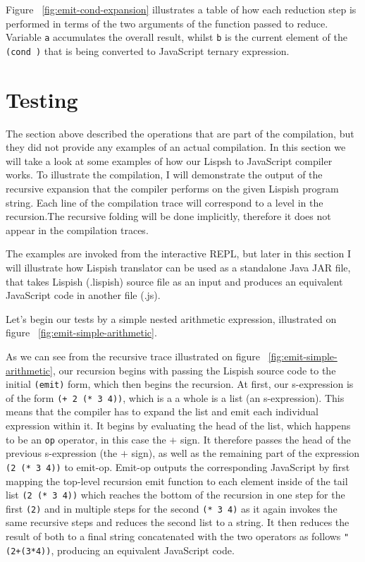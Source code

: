 

Figure ~\ref{fig:emit-cond-expansion} illustrates a table of how each reduction step is performed in terms of the two arguments of the function passed to reduce. Variable \texttt{a} accumulates the overall result, whilst \texttt{b} is the current element of the \texttt{(cond )} that is being converted to JavaScript ternary expression.

\section{Testing}
The section above described the operations that are part of the compilation, but they did not provide any examples of an actual compilation. 
In this section we will take a look at some examples of how our Lispsh to JavaScript compiler works. 
To illustrate the compilation, I will demonstrate the output of the recursive expansion that the compiler performs on the given Lispish program string. 
Each line of the compilation trace will correspond to a level in the recursion.The recursive folding will be done implicitly, therefore it does not appear in the compilation traces. 

The examples are invoked from the interactive REPL, but later in this section I will illustrate how Lispish translator can be used as a standalone Java JAR file, that takes Lispish (.lispish) source file as an input and produces an equivalent JavaScript code in another file (.js).

Let's begin our tests by a simple nested arithmetic expression, illustrated on figure ~\ref{fig:emit-simple-arithmetic}.



As we can see from the recursive trace illustrated on figure ~\ref{fig:emit-simple-arithmetic}, our recursion begins with passing the Lispish source code to the initial \texttt{(emit)} form, which then begins the recursion.
At first, our s-expression is of the form \texttt{(+ 2 (* 3 4))}, which is a a whole is a list (an s-expression). This means that the compiler has to expand the list and emit each individual expression within it. It begins by evaluating the head of the list, which happens to be an \texttt{op} operator, in this case the \texttt{$+$} sign. 
It therefore passes the head of the previous s-expression (the \texttt{$+$} sign), as well as the remaining part of the expression \texttt{(2 (* 3 4))}  to emit-op. 
Emit-op outputs the corresponding JavaScript by first mapping the top-level recursion emit function to each element inside of the tail list \texttt{(2 (* 3 4))} which reaches the bottom of the recursion in one step for the first \texttt{(2)} and in multiple steps for the second \texttt{(* 3 4)} as it again invokes the same recursive steps and reduces the second list to a string. It then reduces the result of both to a final string concatenated with the two operators as follows \texttt{"(2+(3*4))}, producing an equivalent JavaScript code. 

